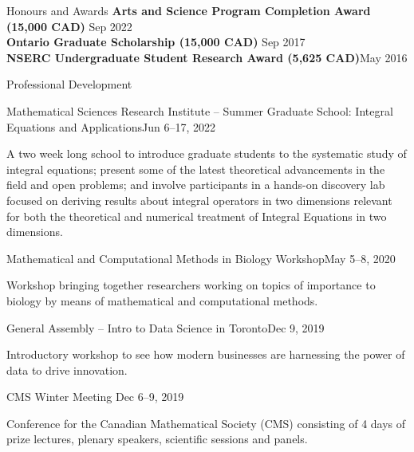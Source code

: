 \documentclass{resume}
\begin{document}
\begin{rSection}{Honours and Awards}
\textbf{Arts and Science Program Completion Award (15,000 CAD)} \hfill {\normalfont Sep 2022} \\
\textbf{Ontario Graduate Scholarship (15,000 CAD)} \hfill {\normalfont Sep 2017} \\
\textbf{NSERC Undergraduate Student Research Award (5,625 CAD)}\hfill {\normalfont May 2016} 
\end{rSection}

\begin{rSection}{Professional Development}

\begin{rSubsection}{Mathematical Sciences Research Institute – Summer Graduate School: Integral Equations and Applications}{Jun 6--17, 2022}{}{}
\item A two week long school to introduce graduate students to the systematic study of integral equations; present some of the latest theoretical advancements in the field and open problems; and involve participants in a hands-on discovery lab focused on deriving results about integral operators in two dimensions relevant for both the theoretical and numerical treatment of Integral Equations in two dimensions. 
\end{rSubsection}

\begin{rSubsection}{Mathematical and Computational Methods in Biology Workshop}{May 5--8, 2020}{}{}
\item Workshop bringing together researchers working on topics of importance to biology by means of mathematical and computational methods.
\end{rSubsection}

\begin{rSubsection}{General Assembly – Intro to Data Science in Toronto}{Dec 9, 2019}{}{}
\item Introductory workshop to see how modern businesses are harnessing the power of data to drive innovation.
\end{rSubsection}

\begin{rSubsection}{CMS Winter Meeting}{ Dec 6--9, 2019}{}{}
\item Conference for the Canadian Mathematical Society (CMS) consisting of 4 days of prize lectures, plenary speakers, scientific sessions and panels.
\end{rSubsection}


\end{rSection}
\end{document}
